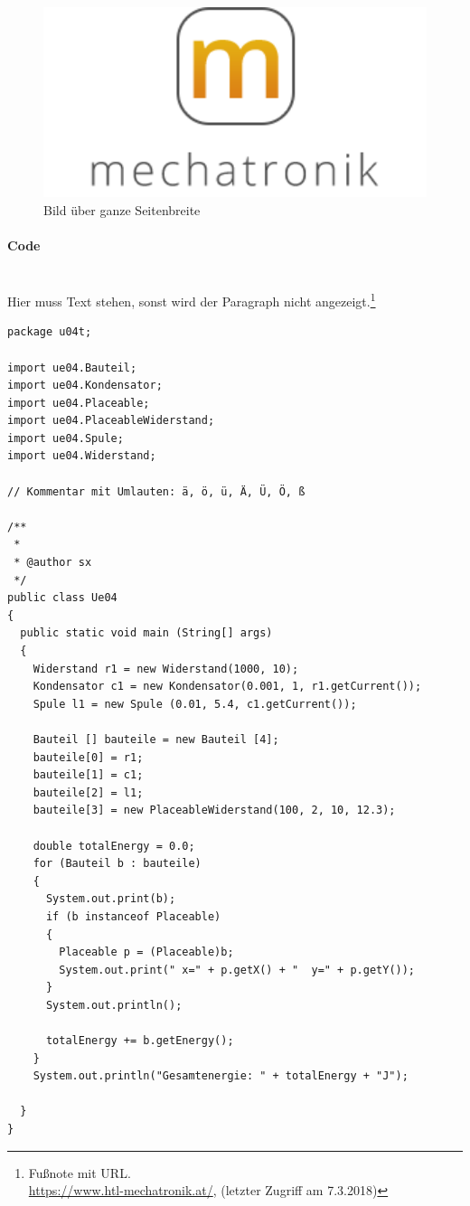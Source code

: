 \begin{figure}[H]
      \includegraphics[width=1\textwidth]{fig/logoMecha}
      \caption{Bild über ganze Seitenbreite}
      \label{Bild über ganze Seitenbreite}
\end{figure}
\newpage

\paragraph{Code}\mbox{}\\
Hier muss Text stehen, sonst wird der Paragraph nicht angezeigt.\footnote{Fußnote mit URL.\\ \url{https://www.htl-mechatronik.at/}, (letzter Zugriff am 7.3.2018)} 

\begin{lstlisting}[style=java,caption=Codebeispiel]
package u04t;

import ue04.Bauteil;
import ue04.Kondensator;
import ue04.Placeable;
import ue04.PlaceableWiderstand;
import ue04.Spule;
import ue04.Widerstand;

// Kommentar mit Umlauten: ä, ö, ü, Ä, Ü, Ö, ß

/**
 *
 * @author sx
 */
public class Ue04
{
  public static void main (String[] args)
  {
    Widerstand r1 = new Widerstand(1000, 10);
    Kondensator c1 = new Kondensator(0.001, 1, r1.getCurrent());
    Spule l1 = new Spule (0.01, 5.4, c1.getCurrent());
    
    Bauteil [] bauteile = new Bauteil [4];
    bauteile[0] = r1;
    bauteile[1] = c1;
    bauteile[2] = l1;
    bauteile[3] = new PlaceableWiderstand(100, 2, 10, 12.3);
    
    double totalEnergy = 0.0;
    for (Bauteil b : bauteile)
    {
      System.out.print(b);
      if (b instanceof Placeable)
      {
        Placeable p = (Placeable)b;
        System.out.print(" x=" + p.getX() + "  y=" + p.getY());
      }
      System.out.println();
      
      totalEnergy += b.getEnergy();
    }
    System.out.println("Gesamtenergie: " + totalEnergy + "J");
    
  }
}

\end{lstlisting}
\newpage

